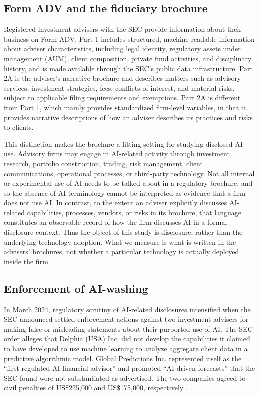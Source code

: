 \documentclass[utf8]{FrontiersinHarvard}
\begin{document}
\subsection{Form ADV and the fiduciary brochure}

Registered investment advisers with the SEC provide information about their business on Form ADV. Part 1 includes structured, machine-readable information about adviser characteristics, including legal identity, regulatory assets under management (AUM), client composition, private fund activities, and disciplinary history, and is made available through the SEC's public data infrastructure. Part 2A is the adviser's narrative brochure and describes matters such as advisory services, investment strategies, fees, conflicts of interest, and material risks, subject to applicable filing requirements and exemptions. Part 2A is different from Part 1, which mainly provides standardized firm-level variables, in that it provides narrative descriptions of how an adviser describes its practices and risks to clients.

This distinction makes the brochure a fitting setting for studying disclosed AI use. Advisory firms may engage in AI-related activity through investment research, portfolio construction, trading, risk management, client communications, operational processes, or third-party technology. Not all internal or experimental use of AI needs to be talked about in a regulatory brochure, and so the absence of AI terminology cannot be interpreted as evidence that a firm does not use AI. In contrast, to the extent an adviser explicitly discusses AI-related capabilities, processes, vendors, or risks in its brochure, that language constitutes an observable record of how the firm discusses AI in a formal disclosure context. Thus the object of this study is disclosure, rather than the underlying technology adoption. What we measure is what is written in the advisers' brochures, not whether a particular technology is actually deployed inside the firm.

\subsection{Enforcement of AI-washing}

In March 2024, regulatory scrutiny of AI-related disclosures intensified when the SEC announced settled enforcement actions against two investment advisers for making false or misleading statements about their purported use of AI. The SEC order alleges that Delphia (USA) Inc. did not develop the capabilities it claimed to have developed to use machine learning to analyze aggregate client data in a predictive algorithmic model. Global Predictions Inc. represented itself as the ``first regulated AI financial advisor'' and promoted ``AI-driven forecasts'' that the SEC found were not substantiated as advertised. The two companies agreed to civil penalties of US\$225{,}000 and US\$175{,}000, respectively \citep{usSEC2024a,usSEC2024b}.
\end{document}
